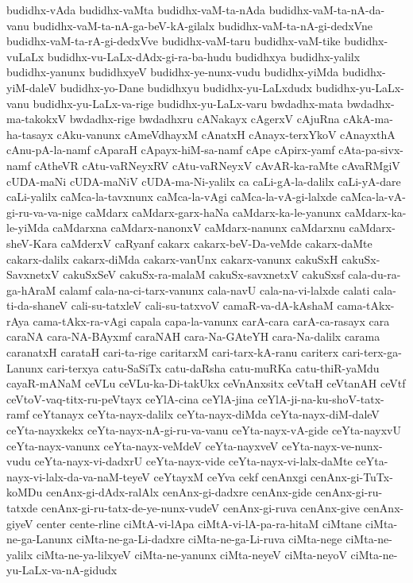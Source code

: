 {budidhx-vAda
budidhx-vaMta
budidhx-vaM-ta-nAda
budidhx-vaM-ta-nA-da-vanu
budidhx-vaM-ta-nA-ga-beV-kA-gilalx
budidhx-vaM-ta-nA-gi-dedxVne
budidhx-vaM-ta-rA-gi-dedxVve
budidhx-vaM-taru
budidhx-vaM-tike
budidhx-vuLaLx
budidhx-vu-LaLx-dAdx-gi-ra-ba-hudu
budidhxya
budidhx-yalilx
budidhx-yanunx
budidhxyeV
budidhx-ye-nunx-vudu
budidhx-yiMda
budidhx-yiM-daleV
budidhx-yo-Dane
budidhxyu
budidhx-yu-LaLxdudx
budidhx-yu-LaLx-vanu
budidhx-yu-LaLx-va-rige
budidhx-yu-LaLx-varu
bwdadhx-mata
bwdadhx-ma-takokxV
bwdadhx-rige
bwdadhxru
cANakayx
cAgerxV
cAjuRna
cAkA-ma-ha-tasayx
cAku-vanunx
cAmeVdhayxM
cAnatxH
cAnayx-terxYkoV
cAnayxthA
cAnu-pA-la-namf
cAparaH
cApayx-hiM-sa-namf
cApe
cApirx-yamf
cAta-pa-sivx-namf
cAtheVR
cAtu-vaRNeyxRV
cAtu-vaRNeyxV
cAvAR-ka-raMte
cAvaRMgiV
cUDA-maNi
cUDA-maNiV
cUDA-ma-Ni-yalilx
ca
caLi-gA-la-dalilx
caLi-yA-dare
caLi-yalilx
caMca-la-tavxnunx
caMca-la-vAgi
caMca-la-vA-gi-lalxde
caMca-la-vA-gi-ru-va-va-nige
caMdarx
caMdarx-garx-haNa
caMdarx-ka-le-yanunx
caMdarx-ka-le-yiMda
caMdarxna
caMdarx-nanonxV
caMdarx-nanunx
caMdarxnu
caMdarx-sheV-Kara
caMderxV
caRyanf
cakarx
cakarx-beV-Da-veMde
cakarx-daMte
cakarx-dalilx
cakarx-diMda
cakarx-vanUnx
cakarx-vanunx
cakuSxH
cakuSx-SavxnetxV
cakuSxSeV
cakuSx-ra-malaM
cakuSx-savxnetxV
cakuSxsf
cala-du-ra-ga-hAraM
calamf
cala-na-ci-tarx-vanunx
cala-navU
cala-na-vi-lalxde
calati
cala-ti-da-shaneV
cali-su-tatxleV
cali-su-tatxvoV
camaR-va-dA-kAshaM
cama-tAkx-rAya
cama-tAkx-ra-vAgi
capala
capa-la-vanunx
carA-cara
carA-ca-rasayx
cara
caraNA
cara-NA-BAyxmf
caraNAH
cara-Na-GAteYH
cara-Na-dalilx
carama
caranatxH
carataH
cari-ta-rige
caritarxM
cari-tarx-kA-ranu
cariterx
cari-terx-ga-Lanunx
cari-terxya
catu-SaSiTx
catu-daRsha
catu-muRKa
catu-thiR-yaMdu
cayaR-mANaM
ceVLu
ceVLu-ka-Di-takUkx
ceVnAnxsitx
ceVtaH
ceVtanAH
ceVtf
ceVtoV-vaq-titx-ru-peVtayx
ceYlA-cina
ceYlA-jina
ceYlA-ji-na-ku-shoV-tatx-ramf
ceYtanayx
ceYta-nayx-dalilx
ceYta-nayx-diMda
ceYta-nayx-diM-daleV
ceYta-nayxkekx
ceYta-nayx-nA-gi-ru-va-vanu
ceYta-nayx-vA-gide
ceYta-nayxvU
ceYta-nayx-vanunx
ceYta-nayx-veMdeV
ceYta-nayxveV
ceYta-nayx-ve-nunx-vudu
ceYta-nayx-vi-dadxrU
ceYta-nayx-vide
ceYta-nayx-vi-lalx-daMte
ceYta-nayx-vi-lalx-da-va-naM-teyeV
ceYtayxM
ceYva
cekf
cenAnxgi
cenAnx-gi-TuTx-koMDu
cenAnx-gi-dAdx-ralAlx
cenAnx-gi-dadxre
cenAnx-gide
cenAnx-gi-ru-tatxde
cenAnx-gi-ru-tatx-de-ye-nunx-vudeV
cenAnx-gi-ruva
cenAnx-give
cenAnx-giyeV
center
cente-rline
ciMtA-vi-lApa
ciMtA-vi-lA-pa-ra-hitaM
ciMtane
ciMta-ne-ga-Lanunx
ciMta-ne-ga-Li-dadxre
ciMta-ne-ga-Li-ruva
ciMta-nege
ciMta-ne-yalilx
ciMta-ne-ya-lilxyeV
ciMta-ne-yanunx
ciMta-neyeV
ciMta-neyoV
ciMta-ne-yu-LaLx-va-nA-gidudx
}
